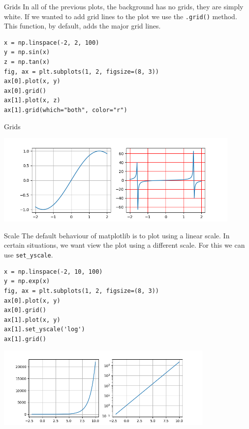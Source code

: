 \documentclass[10pt]{beamer}
\begin{document}
\begin{frame}[label={sec:orgf6f79fd},fragile]{Grids}
 In all of the previous plots, the background has no grids, they are simply
white. If we wanted to add grid lines to the plot we use the \texttt{.grid()}
method. This function, by default, adds the major grid lines.

\begin{verbatim}
x = np.linspace(-2, 2, 100)
y = np.sin(x)
z = np.tan(x)
fig, ax = plt.subplots(1, 2, figsize=(8, 3))
ax[0].plot(x, y)
ax[0].grid()
ax[1].plot(x, z)
ax[1].grid(which="both", color="r")
\end{verbatim}
\end{frame}

\begin{frame}[label={sec:orgc5e0e94}]{Grids}
\begin{center}
\includegraphics[width=0.9\textwidth]{images/grids.png}
\end{center}
\end{frame}

\begin{frame}[label={sec:org374feb5},fragile]{Scale}
 The default behaviour of matplotlib is to plot using a linear scale. In certain
situations, we want view the plot using a different scale. For this we can use \texttt{set\_yscale}.

\begin{verbatim}
x = np.linspace(-2, 10, 100)
y = np.exp(x)
fig, ax = plt.subplots(1, 2, figsize=(8, 3))
ax[0].plot(x, y)
ax[0].grid()
ax[1].plot(x, y)
ax[1].set_yscale('log')
ax[1].grid()
\end{verbatim}

\begin{center}
\includegraphics[width=0.8\textwidth]{images/scale.png}
\end{center}
\end{frame}
\end{document}
